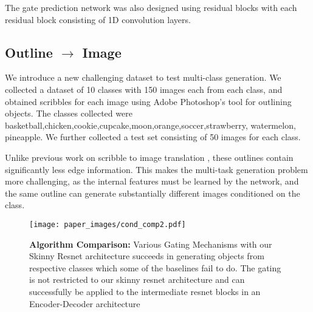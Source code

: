 The gate prediction network was also designed using residual blocks with each residual block consisting of 1D convolution layers. 



\subsection{Outline $\rightarrow$ Image}
We introduce a new challenging dataset to test multi-class generation. 
We collected a dataset of 10 classes with 150 images each from each class, and obtained scribbles for each image using Adobe Photoshop's tool for outlining objects.
The classes collected were basketball,chicken,cookie,cupcake,moon,orange,soccer,strawberry, watermelon, pineapple. 
We further collected a test set consisting of 50 images for each class. 


Unlike previous work on scribble to image translation \cite{isola2016image2image,zhu2017unpaired,wang2017high} , these outlines contain significantly less edge information. This makes the multi-task generation problem more challenging, as the internal features must be learned by the network, and the same outline can generate substantially different images conditioned on the class. 

\begin{figure*}[h]
    \centering
    \texttt{[image: paper\_images/cond\_comp2.pdf]}
    \caption{{\bf Algorithm Comparison:} Various Gating Mechanisms with our Skinny Resnet architecture succeeds in generating objects from respective classes which some of the baselines fail to do. The gating is not restricted to our skinny resnet architecture and can successfully be applied to the intermediate resnet blocks in an Encoder-Decoder architecture \cite{huang2018multimodal} \label{fig:alg_comp} }
    \vspace{-4mm}
\end{figure*}


